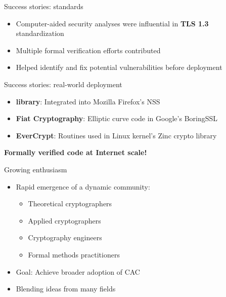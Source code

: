 \documentclass[aspectratio=169, lualatex, handout]{beamer}
\begin{document}
\begin{frame}{Success stories: standards}
	\begin{itemize}
		\item Computer-aided security analyses were influential in \textbf{TLS 1.3} standardization
		\item Multiple formal verification efforts contributed
		\item Helped identify and fix potential vulnerabilities before deployment
	\end{itemize}
\end{frame}

\begin{frame}{Success stories: real-world deployment}
	\begin{itemize}
		\item \textbf{\haclstar library}: Integrated into Mozilla Firefox's NSS
		\item \textbf{Fiat Cryptography}: Elliptic curve code in Google's BoringSSL
		\item \textbf{EverCrypt}: Routines used in Linux kernel's Zinc crypto library
	\end{itemize}
	\begin{center}
		\textbf{Formally verified code at Internet scale!}
	\end{center}
\end{frame}

\begin{frame}{Growing enthusiasm}
	\begin{itemize}
		\item Rapid emergence of a dynamic community:
		      \begin{itemize}
			      \item Theoretical cryptographers
			      \item Applied cryptographers
			      \item Cryptography engineers
			      \item Formal methods practitioners
		      \end{itemize}
		\item Goal: Achieve broader adoption of CAC
		\item Blending ideas from many fields
	\end{itemize}
\end{frame}
\end{document}
